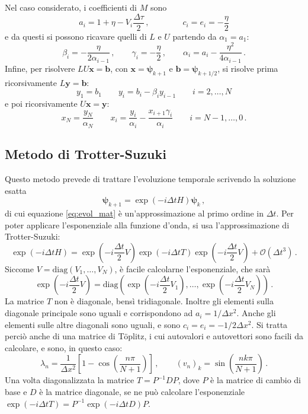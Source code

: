 \documentclass[a4paper, titlepage]{article}
\numberwithin{equation}{section}
\begin{document}
Nel caso considerato, i coefficienti di $M$ sono
\begin{equation*}
    a_i = 1 + \eta - V_i \frac{\Delta\tau}{2}\, , \qquad\qquad
    c_i = e_i = -\frac{\eta}{2}
\end{equation*}
e da questi si possono ricavare quelli di $L$ e $U$ partendo da $\alpha_1 = a_1$:
\begin{equation}
    \beta_i = -\frac{\eta}{2\alpha_{i-1}}\, ,
    \qquad
    \gamma_i = -\frac{\eta}{2}\, ,
    \qquad
    \alpha_i = a_i - \frac{\eta^2}{4\alpha_{i-1}}\, .
    \label{eq:recZ}
\end{equation}
Infine, per risolvere $LU\mathbf{x} = \mathbf{b}$, con $\mathbf{x} = \bm{\psi}_{k+1}$ e $\mathbf{b} = \bm{\psi}_{k+1/2}$, si risolve prima ricorsivamente $L\mathbf{y} = \mathbf{b}$:
\begin{equation}
    y_1 = b_1 \qquad y_i = b_i -\beta_i y_{i-1} \qquad i = 2,\dots,N
    \label{eq:recA}
\end{equation}
e poi ricorsivamente $U\mathbf{x} = \mathbf{y}$:
\begin{equation}
    x_N = \frac{y_N}{\alpha_N} \qquad x_i = \frac{y_i}{\alpha_i} - \frac{x_{i+1}\gamma_i}{\alpha_i} \qquad i = N-1,\dots,0\, .
    \label{eq:recB}
\end{equation}

\subsection{Metodo di Trotter-Suzuki}
Questo metodo prevede di trattare l'evoluzione temporale scrivendo la soluzione esatta
\begin{equation*}
    \bm{\psi}_{k+1} = \exp(-i\Delta t H)\bm{\psi}_k\, ,
\end{equation*}
di cui equazione \eqref{eq:evol_mat} è un'approssimazione al primo ordine in $\Delta t$. Per poter applicare l'esponenziale alla funzione d'onda, si usa l'approssimazione di Trotter-Suzuki:
\begin{equation*}
    \exp(-i \Delta t H) = \exp\left(-i \frac{\Delta t}{2} V\right) \exp(-i \Delta t T) \exp\left(-i \frac{\Delta t}{2} V\right) + \mathcal{O}(\Delta t^3)\, .
\end{equation*}
Siccome $V = \text{diag}(V_1,\dots,V_N)$, è facile calcolarne l'esponenziale, che sarà
\[
    \exp(-i\frac{\Delta t}{2} V) = \text{diag}\left(\exp(-i\frac{\Delta t}{2} V_1),\dots,\exp(-i\frac{\Delta t}{2} V_N)\right)\, .
\]
La matrice $T$ non è diagonale, bensì tridiagonale. Inoltre gli elementi sulla diagonale principale sono uguali e corrispondono ad $a_i = 1/\Delta x^2$. Anche gli elementi sulle altre diagonali sono uguali, e sono $c_i = e_i = -1/2\Delta x^2$. Si tratta perciò anche di una matrice di Töplitz, i cui autovalori e autovettori sono facili da calcolare, e sono, in questo caso:
\[
    \lambda_n = \frac{1}{\Delta x^2} \left[1 -\cos\left(\frac{n\pi}{N+1}\right)\right]\, ,
    \qquad
    (v_n)_k = \sin\left(\frac{nk\pi}{N+1}\right)\, .
\]
Una volta diagonalizzata la matrice $T = P^{-1}DP$, dove $P$ è la matrice di cambio di base e $D$ è la matrice diagonale, se ne può calcolare l'esponenziale $\exp(-i\Delta t T) = P^{-1}\exp(-i\Delta t D)P$.
\end{document}
